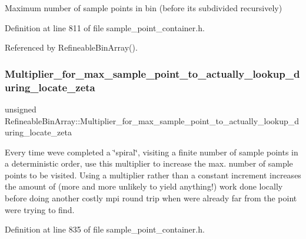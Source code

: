 Maximum number of sample points in bin (before it\textquotesingle{}s subdivided recursively) 



Definition at line 811 of file sample\+\_\+point\+\_\+container.\+h.



Referenced by Refineable\+Bin\+Array().

\mbox{\label{classRefineableBinArray_a058f9e44828158525e7655d4007cae76}} 
\subsubsection{\texorpdfstring{Multiplier\+\_\+for\+\_\+max\+\_\+sample\+\_\+point\+\_\+to\+\_\+actually\+\_\+lookup\+\_\+during\+\_\+locate\+\_\+zeta}{Multiplier\_for\_max\_sample\_point\_to\_actually\_lookup\_during\_locate\_zeta}}
{\footnotesize\ttfamily unsigned Refineable\+Bin\+Array\+::\+Multiplier\+\_\+for\+\_\+max\+\_\+sample\+\_\+point\+\_\+to\+\_\+actually\+\_\+lookup\+\_\+during\+\_\+locate\+\_\+zeta\hspace{0.3cm}{\ttfamily [private]}}



Every time we\textquotesingle{}ve completed a \char`\"{}spiral\char`\"{}, visiting a finite number of sample points in a deterministic order, use this multiplier to increase the max. number of sample points to be visited. Using a multiplier rather than a constant increment increases the amount of (more and more unlikely to yield anything!) work done locally before doing another costly mpi round trip when we\textquotesingle{}re already far from the point we\textquotesingle{}re trying to find. 



Definition at line 835 of file sample\+\_\+point\+\_\+container.\+h.



